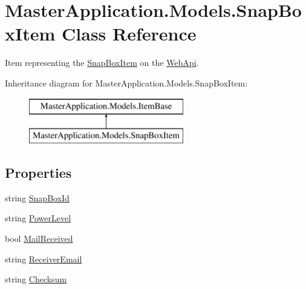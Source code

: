 \hypertarget{class_master_application_1_1_models_1_1_snap_box_item}{}\section{Master\+Application.\+Models.\+Snap\+Box\+Item Class Reference}
\label{class_master_application_1_1_models_1_1_snap_box_item}


Item representing the \mbox{\hyperlink{class_master_application_1_1_models_1_1_snap_box_item}{Snap\+Box\+Item}} on the \mbox{\hyperlink{namespace_web_api}{Web\+Api}}.  


Inheritance diagram for Master\+Application.\+Models.\+Snap\+Box\+Item\+:\begin{figure}[H]
\begin{center}
\leavevmode
\includegraphics[height=2.000000cm]{class_master_application_1_1_models_1_1_snap_box_item}
\end{center}
\end{figure}
\subsection*{Properties}
\begin{DoxyCompactItemize}
\item 
string \mbox{\hyperlink{class_master_application_1_1_models_1_1_snap_box_item_af95a9d496c1b8e33ba06815ecee2eb7c}{Snap\+Box\+Id}}
\item 
string \mbox{\hyperlink{class_master_application_1_1_models_1_1_snap_box_item_a784aedee12ff737a9485b4c91ebad2fc}{Power\+Level}}
\item 
bool \mbox{\hyperlink{class_master_application_1_1_models_1_1_snap_box_item_a72b4dc3e00e557c758dd7388ad0ff4b0}{Mail\+Received}}
\item 
string \mbox{\hyperlink{class_master_application_1_1_models_1_1_snap_box_item_a42244f1becb8ae7f264bbf69ea048eae}{Receiver\+Email}}
\item 
string \mbox{\hyperlink{class_master_application_1_1_models_1_1_snap_box_item_a4a7f075a0788a31fcf04a21dabaa6b79}{Checksum}}
\end{DoxyCompactItemize}

